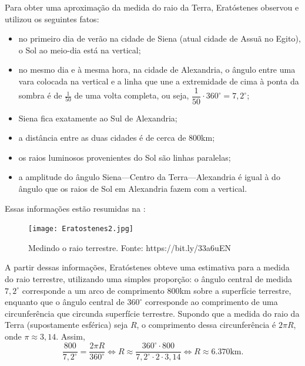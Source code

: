 Para obter uma aproximação da medida do raio da Terra, Eratóstenes observou e utilizou os seguintes fatos:
\begin{itemize}
    \item{}
    no primeiro dia de verão na cidade de Siena (atual cidade de Assuã no Egito), o Sol ao meio-dia está na vertical;
    
    \item{}
    no mesmo dia e à mesma hora, na cidade de Alexandria, o ângulo entre uma vara colocada na vertical e a linha que une a extremidade de cima à ponta da sombra é de $\frac{1}{50}$  de uma volta completa, ou seja, $\dfrac{1}{50} \cdot 360^\circ=7,2^\circ$;
    
    \item{}
    Siena fica exatamente ao Sul de Alexandria;
    
    \item{}
    a distância entre as duas cidades é de cerca de $800$km;
    
    \item{}
    os raios luminosos provenientes do Sol são linhas paralelas;
    
    \item{}
    a amplitude do ângulo  Siena—Centro da Terra—Alexandria é igual à do ângulo que os raios de Sol em Alexandria fazem com a vertical.
\end{itemize}

Essas informações estão resumidas na  :

\begin{figure}[H]
    \centering
    \texttt{[image: Eratostenes2.jpg]}
    \caption{Medindo o raio terrestre. Fonte: https://bit.ly/33a6uEN}
    \label{Eratostenes2}
\end{figure}

 A partir dessas informações, Eratóstenes obteve uma estimativa para a medida do raio terrestre, utilizando uma simples proporção: o ângulo central de medida $7,2^\circ$ corresponde a um arco de comprimento $800$km sobre a superfície terrestre, enquanto que o ângulo central de $360^\circ$ corresponde ao comprimento de uma circunferência que circunda superfície terrestre. Supondo que a medida do raio da Terra (supostamente esférica) seja $R$, o comprimento dessa circunferência é $2\pi R$, onde $\pi \approx 3,14$. Assim,
 $$\frac{800}{7,2^\circ}=\frac{2\pi R}{360^\circ} \iff R \approx \frac{360^\circ \cdot 800}{7,2^\circ \cdot 2 \cdot 3,14}  \iff R\approx 6.370 \text{km}.$$

